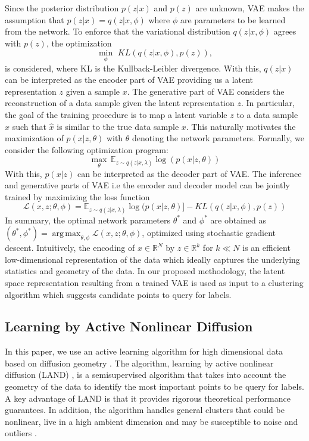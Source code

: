 \documentclass{article}
\def\E{{\mathbb E}}
\DeclareMathOperator*{\argmax}{arg\,max}
\begin{document}
Since the posterior distribution $p(z|x)$ and $p(z)$ are unknown, VAE makes the assumption that $p(z|x) = q(z|x,\phi)$ where $\phi$ are parameters to be learned from the network. To enforce that the variational distribution $q(z|x,\phi)$ agrees with $p(z)$, the optimization \[\min_{\phi}\,\, KL(q(z|x,\phi),p(z)),\] is considered, where KL is the Kullback-Leibler divergence.  With this, $q(z|x)$ can be interpreted as the encoder part of VAE providing us a latent representation $z$ given a sample $x$. The generative part of VAE considers the reconstruction of a data sample given the latent representation $z$. In particular, the goal of the training procedure is to map a latent variable $z$ to a data sample $\hat{x}$ such that $\hat{x}$ is similar to the true data sample $x$. This naturally motivates the maximization of $p(x|z,\theta)$ with $\theta$ denoting the network parameters. Formally, we consider the following optimization program:
\[
\max_{\theta}\, \E_{z \sim q(z|x,\lambda)} \log(p(x|z,\theta))
\]
With this, $p(x|z)$ can be interpreted as the decoder part of VAE. The inference and generative parts of VAE i.e the encoder and decoder model can be jointly trained by maximizing the loss function $$\mathcal{L}(x,z;\theta,\phi)
=  \E_{z\sim q(z|x,\lambda)} \log(p(x|z,\theta)] - KL(q(z|x,\phi),p(z))$$ In summary, the optimal network parameters $\theta^{*}$ and $\phi^{*}$ are obtained as $(\theta^{*},\phi^{*})=\argmax_{\theta,\phi} \mathcal{L}(x,z;\theta,\phi)$, optimized using stochastic gradient descent.  Intuitively, the encoding of $x\in\mathbb{R}^{N}$ by $z\in\mathbb{R}^{k}$ for $k\ll N$ is an efficient low-dimensional representation of the data which ideally captures the underlying statistics and geometry of the data.  In our proposed methodology, the latent space representation resulting from a trained VAE is used as input to a clustering algorithm which suggests candidate points to query for labels.

\subsection{Learning by Active Nonlinear Diffusion}
In this paper, we use an active learning algorithm for high dimensional data based on diffusion geometry \cite{Murphy2019_Unsupervised, Maggioni2019_LUND, Murphy2020_Spectral}. The algorithm, learning by active nonlinear diffusion (LAND) \cite{Maggioni2019_LAND}, is a semisupervised algorithm that takes into account the geometry of the data to identify the most important points to be query for labels. A key advantage of LAND is that it provides rigorous theoretical performance guarantees. In addition, the algorithm handles general clusters that could be nonlinear, live in a high ambient dimension and may be susceptible to noise and outliers \cite{Maggioni2019_LAND}.
\end{document}

